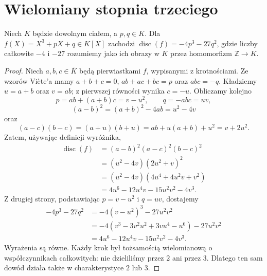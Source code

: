 \section{Wielomiany stopnia trzeciego}

\begin{twierdzenie}\label{aa:tw:cubic-disc}
Niech $K$ będzie dowolnym ciałem, a $p,q\in K$.
Dla $f(X)=X^3+pX+q\in K[X]$ zachodzi
$\operatorname{disc}(f)=-4p^3-27q^2$,
gdzie liczby całkowite $-4$ i $-27$ rozumiemy
jako ich obrazy w $K$ przez homomorfizm $\mathbb Z\to K$.
\end{twierdzenie}
\begin{proof}
Niech $a,b,c\in\overline K$ będą pierwiastkami
$f$, wypisanymi z krotnościami. Ze wzorów Viète'a
mamy $a+b+c=0$, $ab+ac+bc=p$ oraz $abc=-q$.
Kładziemy $u=a+b$ oraz $v=ab$; z pierwszej równości
wynika $c=-u$. Obliczamy kolejno
\[
 p=ab+(a+b)c=v-u^2,\qquad
 q=-abc=uv,
\]
\[
 (a-b)^2=(a+b)^2-4ab=u^2-4v
\]
oraz
\[
 (a-c)(b-c)=(a+u)(b+u)
 =ab+u(a+b)+u^2=v+2u^2.
\]
Zatem, używając definicji wyróżnika,
\[
 \begin{aligned}
 \operatorname{disc}(f)
 &=(a-b)^2(a-c)^2(b-c)^2\\
 &=(u^2-4v)(2u^2+v)^2\\
 &=(u^2-4v)(4u^4+4u^2v+v^2)\\
 &=4u^6-12u^4v-15u^2v^2-4v^3.
 \end{aligned}
\]
Z drugiej strony, podstawiając $p=v-u^2$ i $q=uv$,
dostajemy
\[
 \begin{aligned}
 -4p^3-27q^2
 &=-4(v-u^2)^3-27u^2v^2\\
 &=-4(v^3-3v^2u^2+3vu^4-u^6)-27u^2v^2\\
 &=4u^6-12u^4v-15u^2v^2-4v^3.
 \end{aligned}
\]
Wyrażenia są równe. Każdy krok był tożsamością
wielomianową o współczynnikach całkowitych:
nie dzieliliśmy przez $2$ ani przez $3$.
Dlatego ten sam dowód działa także w charakterystyce
$2$ lub $3$.
\end{proof}

